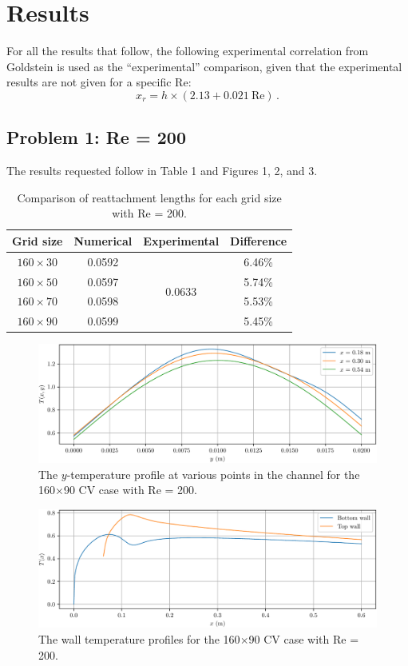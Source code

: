 \documentclass{article}
\begin{document}
\section{Results}

For all the results that follow, the following experimental correlation from Goldstein is used as the ``experimental'' comparison, given that the experimental results are not given for a specific Re:
\[
	x_r = h \times (2.13 + 0.021~\text{Re})\,.
\]

\subsection{Problem 1: Re = 200}

The results requested follow in Table 1 and Figures 1, 2, and 3.

\def\arraystretch{1.3}
\begin{table}[H]
	\small
	\centering
	\caption{Comparison of reattachment lengths for each grid size with Re = 200.}
	\vspace{0.2cm}
	\begin{tabular}{c|c|c|c}
		Grid size & Numerical & Experimental & Difference \\
		\hline
		$160\times30$ & 0.0592 & \multirow{4}{*}{0.0633} & 6.46\% \\
		$160\times50$ & 0.0597 & & 5.74\% \\
		$160\times70$ & 0.0598 & & 5.53\% \\
		$160\times90$ & 0.0599 & & 5.45\% \\
	\end{tabular}
	\label{table:b-temps}
\end{table}

\begin{figure}[H]
	\centering
	\includegraphics[width=0.9\linewidth]{../results/1a_Ty}
	\caption{The $y$-temperature profile at various points in the channel for the 160$\times$90 CV case with Re = 200.}
	\label{fig:1a_Ty}
\end{figure}

\begin{figure}[H]
	\centering
	\includegraphics[width=0.9\linewidth]{../results/1b_Twall}
	\caption{The wall temperature profiles for the 160$\times$90 CV case with Re = 200.}
	\label{fig:1b_Twall}
\end{figure}
\end{document}
